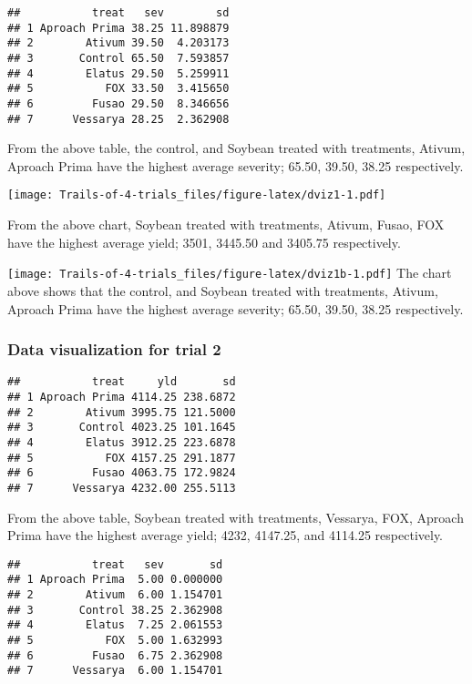 \documentclass[
]{article}
\begin{document}
\begin{verbatim}
##           treat   sev        sd
## 1 Aproach Prima 38.25 11.898879
## 2        Ativum 39.50  4.203173
## 3       Control 65.50  7.593857
## 4        Elatus 29.50  5.259911
## 5           FOX 33.50  3.415650
## 6         Fusao 29.50  8.346656
## 7      Vessarya 28.25  2.362908
\end{verbatim}

From the above table, the control, and Soybean treated with treatments,
Ativum, Aproach Prima have the highest average severity; 65.50, 39.50,
38.25 respectively.

\texttt{[image: Trails-of-4-trials\_files/figure-latex/dviz1-1.pdf]}

From the above chart, Soybean treated with treatments, Ativum, Fusao,
FOX have the highest average yield; 3501, 3445.50 and 3405.75
respectively.

\texttt{[image: Trails-of-4-trials\_files/figure-latex/dviz1b-1.pdf]} The
chart above shows that the control, and Soybean treated with treatments,
Ativum, Aproach Prima have the highest average severity; 65.50, 39.50,
38.25 respectively.

\hypertarget{data-visualization-for-trial-2}{%
\subsubsection{Data visualization for trial
2}\label{data-visualization-for-trial-2}}

\begin{verbatim}
##           treat     yld       sd
## 1 Aproach Prima 4114.25 238.6872
## 2        Ativum 3995.75 121.5000
## 3       Control 4023.25 101.1645
## 4        Elatus 3912.25 223.6878
## 5           FOX 4157.25 291.1877
## 6         Fusao 4063.75 172.9824
## 7      Vessarya 4232.00 255.5113
\end{verbatim}

From the above table, Soybean treated with treatments, Vessarya, FOX,
Aproach Prima have the highest average yield; 4232, 4147.25, and 4114.25
respectively.

\begin{verbatim}
##           treat   sev       sd
## 1 Aproach Prima  5.00 0.000000
## 2        Ativum  6.00 1.154701
## 3       Control 38.25 2.362908
## 4        Elatus  7.25 2.061553
## 5           FOX  5.00 1.632993
## 6         Fusao  6.75 2.362908
## 7      Vessarya  6.00 1.154701
\end{verbatim}
\end{document}
